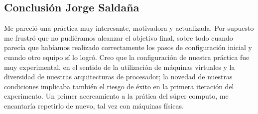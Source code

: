 \documentclass[12pt,a4paper]{article}
\begin{document}
\subsection{Conclusión Jorge Saldaña}
Me pareció una práctica muy interesante, motivadora y actualizada. Por supuesto me frustró que no pudiéramos alcanzar el objetivo final, sobre todo cuando parecía que habíamos realizado correctamente los pasos de configuración inicial y cuando otro equipo sí lo logró.
Creo que la configuración de nuestra práctica fue muy experimental, en el sentido de la utilización de máquinas virtuales y la diversidad de nuestras arquitecturas de procesador; la novedad de nuestras condiciones implicaba también el riesgo de éxito en la primera iteración del experimento.
Un primer acercamiento a la prática del súper computo, me encantaría repetirlo de nuevo, tal vez con máquinas físicas.
\end{document}

